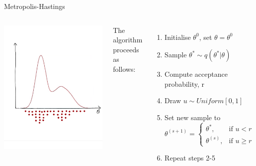 \documentclass[compress]{beamer}
\begin{document}
\begin{frame}[label=sec-7-13]{Metropolis-Hastings}
\begin{columns}[c] 
\includegraphics[width=1\linewidth]{MH6}

The algorithm proceeds as follows:\\
\begin{enumerate}
\item Initialise $\theta^{0}$, set $\theta = \theta^{0}$
\item Sample $\theta^* \sim q(\theta^*|\theta)$
\item Compute acceptance probability, r
\item Draw $u \sim Uniform[0,1]$
\item Set new sample to 
\[
 \theta^{(s+1)} = 
\begin{cases}
    \theta^*, & \text{if } u < r\\
    \theta^{(s)}, & \text{if } u \geqslant r
\end{cases}
\]
\item Repeat steps 2-5
\end{enumerate}
\end{columns}
\end{frame}
\end{document}

